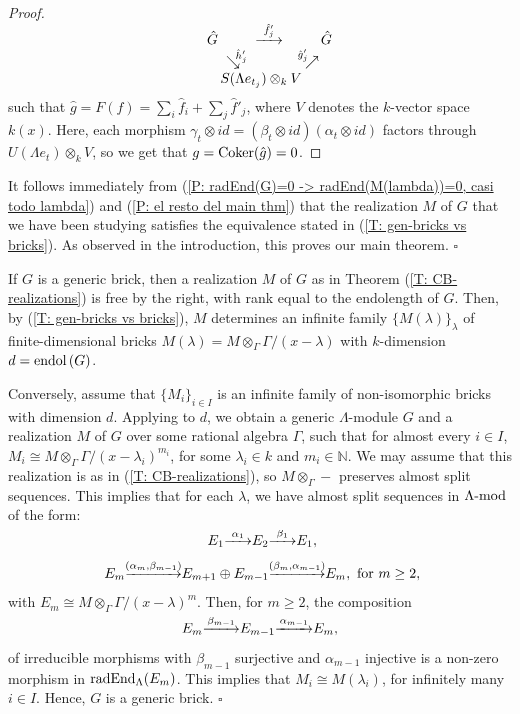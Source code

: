 \documentclass{article}
\theoremstyle{definition}
\newcommand{\End}{{ \rm End }}
\newcommand{\Coker}{{ \rm Coker }}
\newcommand{\rad}{{ \rm rad }}
\newcommand{\g}{\hbox{-}}
\newcommand{\Endol}[1]{\hbox{\rm endol}\,(#1)}
\newcommand{\hueca}[1]{\mathbb{#1}}
\renewcommand{\mod}{{\rm mod }}
\newcommand{\rightmap}[1]{\smash{\mathop{\hbox to 
20pt{\rightarrowfill}}\limits^{#1}}}
\newcommand{\ddmapdown}[1]
{\hskip-5pt\mathop{\searrow\hskip-6pt\raise5pt\hbox{$\scriptstyle#1$}}}
\newcommand{\ddmapup}[1]
{\hskip-8pt\mathop{\hskip-5pt\raise6pt\hbox{$\scriptstyle#1$}\hskip-5pt\nearrow}
}
\begin{document}
\begin{proof}
$$\begin{matrix}
\hat{G}\hbox{\hskip-1.5cm}&\hbox{\hskip1cm}\rightmap{ \ \hat{f}'_j \ }&\hat{G}\\
&\ddmapdown{\hat{h}'_j}\hbox{\hskip.4cm}&\ddmapup{\hat{g}'_j}\hbox{\hskip.4cm}\\
&\hbox{\hskip .6cm}S(\Lambda e_{t_j})\otimes_kV&\\
\end{matrix}$$
such that $\hat{g}=F(f)=\sum_i\hat{f}_i+\sum_j\hat{f}'_j$, 
where $V$ denotes the $k$-vector space $k(x)$. 
Here, each morphism $\gamma_t\otimes id=(\beta_t\otimes id)(\alpha_t\otimes id)$ factors through $U(\Lambda e_t)\otimes_kV$, so 
 we get that $g=\Coker(\hat{g})=0$. 
\end{proof}

It follows immediately from (\ref{P: radEnd(G)=0 -> radEnd(M(lambda))=0, casi todo lambda})
and (\ref{P: el resto del main thm}) that the realization $M$ of $G$ that we have been studying satisfies the equivalence stated in (\ref{T: gen-bricks vs bricks}). As observed in the introduction, this proves our main theorem. 
\hfill$\square$

\medskip
{} If $G$ is a generic brick, then a realization $M$ of $G$ as in Theorem  (\ref{T: CB-realizations}) is free by the right, with rank equal to the endolength of $G$. Then, by (\ref{T: gen-bricks vs bricks}), $M$ determines an infinite family $\{M(\lambda)\}_\lambda$ of finite-dimensional bricks  $M(\lambda)=M\otimes_\Gamma \Gamma/(x-\lambda)$ with $k$-dimension $d=\Endol{G}$. 

Conversely, assume that $\{M_i\}_{i\in I}$ is an infinite family of non-isomorphic bricks with dimension $d$. Applying \cite[(5.5)]{CB2} to $d$, we obtain a generic $\Lambda$-module $G$ and a realization $M$ of $G$ over some rational algebra $\Gamma$, such that for  almost every $i\in I$,  $M_i\cong M\otimes_\Gamma\Gamma/(x-\lambda_i)^{m_i}$, for some $\lambda_i\in k$ and  $m_i\in\hueca{N}$. We may assume that this realization is as in (\ref{T: CB-realizations}), so $M\otimes_\Gamma-$ preserves almost split sequences. This implies that for each $\lambda$, we have   
 almost split sequences in $\Lambda\g\mod$ of the form: 
$$\begin{matrix} \  E_1  \rightmap{\alpha_1} E_2\rightmap{\beta_1} E_1,\\
 \,\\
 \ E_m \rightmap{(\alpha_m,\beta_{m-1})} E_{m+1}\oplus E_{m-1}\rightmap{(\beta_m,\alpha_{m-1})}E_m, \hbox{ for } m \geq  2,\\
\end{matrix}$$
with $E_m\cong M\otimes_\Gamma\Gamma/(x-\lambda)^m$. Then, for $m\geq 2$, the composition 
$$E_m\rightmap{ \ \beta_{m-1} \ }
E_{m-1}
\rightmap{ \ \alpha_{m-1} \ }E_m,$$
of irreducible morphisms with $\beta_{m-1}$ surjective and $\alpha_{m-1}$ injective is a non-zero morphism in $\rad\End_\Lambda(E_m)$.   This implies that $M_i\cong M(\lambda_i)$, for infinitely many $i\in I$. Hence, $G$ is a generic brick. 
\hfill$\square$
\end{document}
